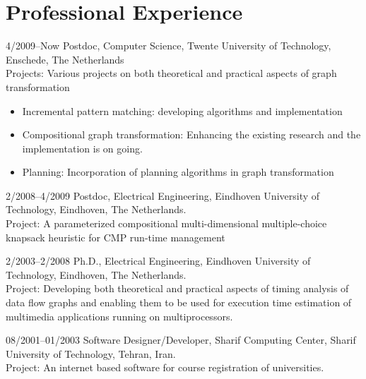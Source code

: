 \documentclass[a4paper]{article}
\begin{document}
\section{Professional Experience}

\begin{CV}
\item[4/2009--Now]Postdoc, Computer Science, Twente University of
Technology, Enschede, The Netherlands \\
Projects: Various projects on both theoretical and practical aspects of graph transformation
\begin{itemize}
  \item Incremental pattern matching: developing algorithms and implementation
  \item Compositional graph transformation: Enhancing the existing research and the implementation is on going.
  \item Planning: Incorporation of planning algorithms in graph transformation
\end{itemize}
\item[2/2008--4/2009] Postdoc, Electrical Engineering, Eindhoven University
of Technology, Eindhoven, The Netherlands. \\
Project: A parameterized compositional multi-dimensional multiple-choice knapsack heuristic for CMP run-time management

\item[2/2003--2/2008] Ph.D., Electrical Engineering, Eindhoven
University of Technology, Eindhoven, The Netherlands.\\
Project: Developing both theoretical and practical aspects of timing analysis of data flow graphs
and enabling them to be used for execution time estimation of multimedia applications running on multiprocessors.

\item[08/2001--01/2003] Software Designer/Developer, Sharif Computing Center, Sharif University of Technology, Tehran,
Iran.\\
Project: An internet based software for course registration of
universities.
\end{CV}
\end{document}
